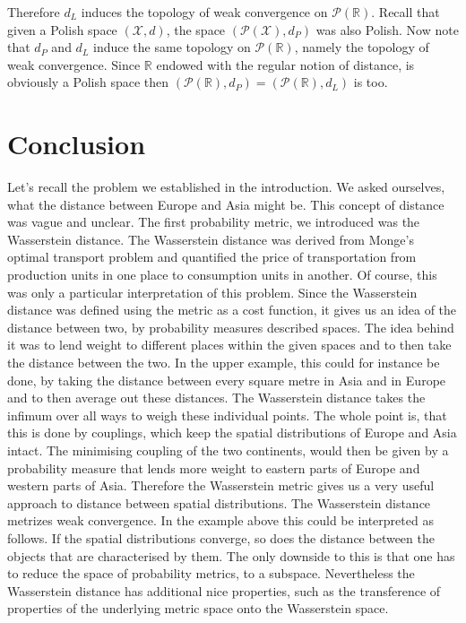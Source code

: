 \documentclass[11pt,a4paper]{article}
\begin{document}
\noindent{}Therefore $d_L$ induces the topology of weak convergence on $\mathcal{P}(\mathbb{R})$. Recall that given a Polish space $(\mathcal{X},d)$, the space $(\mathcal{P(X)},d_P)$ was also Polish. Now note that $d_P$ and $d_L$ induce the same topology on $\mathcal{P}(\mathbb{R})$, namely the topology of weak convergence. Since $\mathbb{R}$ endowed with the regular notion of distance, is obviously a Polish space then $(\mathcal{P}(\mathbb{R}),d_P) = (\mathcal{P}(\mathbb{R}),d_L)$ is too.\vspace{2em}\\
\section{Conclusion}
Let's recall the problem we established in the introduction. We asked ourselves, what the distance between Europe and Asia might be. This concept of distance was vague and unclear. The first probability metric, we introduced was the Wasserstein distance. The Wasserstein distance was derived from Monge's optimal transport problem and quantified the price of transportation from production units in one place to consumption units in another. Of course, this was only a particular interpretation of this problem. Since the Wasserstein distance was defined using the metric as a cost function, it gives us an idea of the distance between two, by probability measures described spaces. The idea behind it was to lend weight to different places within the given spaces and to then take the distance between the two. In the upper example, this could for instance be done, by taking the distance between every square metre in Asia and in Europe and to then average out these distances. The Wasserstein distance takes the infimum over all ways to weigh these individual points. The whole point is, that this is done by couplings, which keep the spatial distributions of Europe and Asia intact. The minimising coupling of the two continents, would then be given by a probability measure that lends more weight to eastern parts of Europe and western parts of Asia. Therefore the Wasserstein metric gives us a very useful approach to distance between spatial distributions. The Wasserstein distance metrizes weak convergence. In the example above this could be interpreted  as follows. If the spatial distributions converge, so does the distance between the objects that are characterised by them. The only downside to this is that one has to reduce the space of probability metrics, to a subspace. Nevertheless the Wasserstein distance has additional nice properties, such as the transference of properties of the underlying metric space onto the Wasserstein space.\vspace{1em}\\
\end{document}
